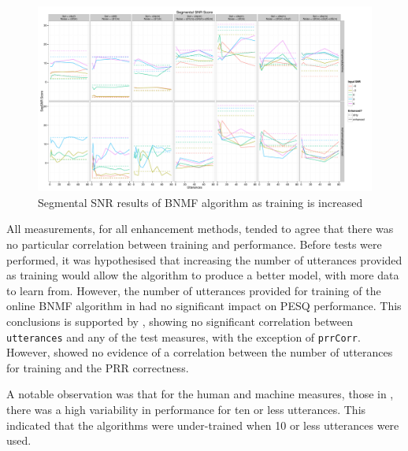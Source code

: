 \begin{figure}[p]
\noindent \begin{centering}
\includegraphics[angle=90,width=1\textwidth,height=0.95\textheight,keepaspectratio]{fig/R/train/segSNR}
\par\end{centering}

\protect\caption{\label{fig:vary-train-segsnr}Segmental \acs{SNR} results of \acs{BNMF}
algorithm as training is increased}
\end{figure}


\clearpage{}

All measurements, for all enhancement methods, tended to agree that
there was no particular correlation between training and performance.
Before tests were performed, it was hypothesised that increasing the
number of utterances provided as training would allow the algorithm
to produce a better model, with more data to learn from. However,
the number of utterances provided for training of the online \ac{BNMF}
algorithm in  had no significant impact on
\ac{PESQ} performance. This conclusions is supported by ,
showing no significant correlation between \lstinline!utterances!
and any of the test measures, with the exception of \lstinline!prrCorr!.
However,  showed no evidence of a correlation
between the number of utterances for training and the \ac{PRR} correctness.

A notable observation was that for the human and machine measures,
those in ,
there was a high variability in performance for ten or less utterances.
This indicated that the algorithms were under-trained when 10 or less
utterances were used.

